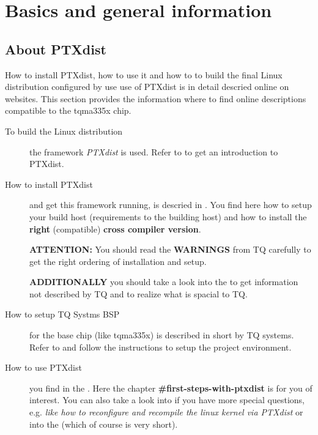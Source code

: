 \chapter{Basics and general information}%
\label{cha:Basics_and_general_information}


\section{About PTXdist}%
\label{sec:linux_distribution_build}

How to install PTXdist, how to use it and how to to build the final Linux
distribution configured by use use of PTXdist is in detail descried  online on
websites. This section provides the information where to find online
descriptions compatible to the tqma335x chip.

\begin{description}
    \item[To build the Linux distribution] the framework \textit{PTXdist} is
        used. Refer to \textbf{\cite{ptxdist} } to get an introduction to
        PTXdist.

    \item[How to install PTXdist] and get this framework running, is descried in
        \textbf{\cite{tq_bsp119_install}}. You find here how to setup your
        build host (requirements to the building host) and how to install the
        \textbf{right} (compatible) \textbf{cross compiler version}.

        \textbf{ATTENTION:} You should read the \textbf{WARNINGS} from TQ
        carefully to get the right ordering of installation and setup.

        \textbf{ADDITIONALLY} you should take a look into the
        \textbf{\cite[PTXdist general installation guide]{ptxdist_install} }
        to get information not described by TQ and to realize what is spacial
        to TQ.

    \item[How to setup TQ Systms BSP] for the base chip (like tqma335x)
        is described in short by TQ systems. Refer to
        \textbf{\cite{tq_bsp119_configurationi}} and follow the instructions to
        setup the project environment.

    \item[How to use PTXdist] you find in the
        \textbf{\cite[PTXdist user manual]{ptxdist_manual}}. Here the chapter
        \textbf{\#first-steps-with-ptxdist} is for you of interest. You can also
        take a look into \cite{ptxdist_developer} if you have more special
        questions, e.g. \textit{like how to reconfigure and recompile the linux
        kernel via PTXdist} or into the \cite[PTXdist FAQ list]{ptxdist_faq}
        (which of course is very short).


\end{description}

